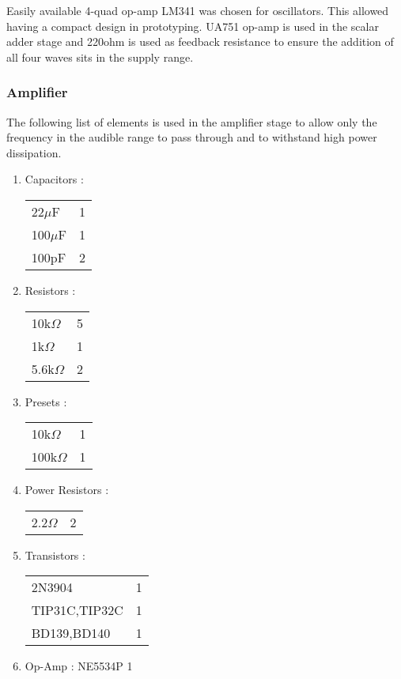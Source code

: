 Easily available 4-quad op-amp LM341 was chosen for oscillators. This allowed having a compact design in prototyping. UA751 op-amp is used in the scalar adder stage and 220ohm is used as feedback resistance to ensure the addition of all four waves sits in the supply range.
\subsubsection*{Amplifier}
The following list of elements is used in the amplifier stage to allow only the frequency in the audible range to pass through and to withstand high power dissipation.
\begin{enumerate}
    \item Capacitors :
          \begin{tabular}{l r}
              22$\mu$F  & 1 \\
              100$\mu$F & 1 \\
              100pF     & 2 \\
          \end{tabular}
    \item Resistors :
          \begin{tabular}{l r}
              10k$\Omega$  & 5 \\
              1k$\Omega$   & 1 \\
              5.6k$\Omega$ & 2 \\
          \end{tabular}
    \item Presets :
          \begin{tabular}{l r}
              10k$\Omega$  & 1 \\
              100k$\Omega$ & 1 \\
          \end{tabular}
    \item Power Resistors :
          \begin{tabular}{l r}
              2.2$\Omega$ & 2 \\
          \end{tabular}
    \item Transistors :
          \begin{tabular}{l r}
              2N3904        & 1 \\
              TIP31C,TIP32C & 1 \\
              BD139,BD140   & 1 \\
          \end{tabular}
    \item Op-Amp : NE5534P   1
\end{enumerate}